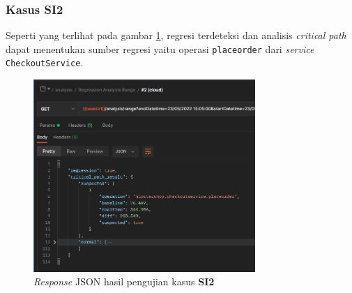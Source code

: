 \pagebreak


\subsubsection{Kasus SI2}
Seperti yang terlihat pada gambar \ref{result_json_2}, regresi terdeteksi dan analisis \textit{critical path} dapat menentukan sumber regresi yaitu operasi \texttt{placeorder} dari \textit{service} \texttt{CheckoutService}.
\begin{figure}[!htb]
	\centering
	\includegraphics[width=0.75\textwidth]{resources/ch4/json/2.png}
	\caption{\textit{Response} JSON hasil pengujian kasus \textbf{SI2}}
	\label{result_json_2}
\end{figure}

\pagebreak

